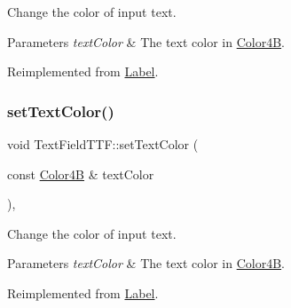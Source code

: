 Change the color of input text. 
\begin{DoxyParams}{Parameters}
{\em text\+Color} & The text color in \hyperlink{structColor4B}{Color4B}. \\
\hline
\end{DoxyParams}


Reimplemented from \hyperlink{classLabel_a692d2efd4b152b36df5cfcfbd9ee856d}{Label}.

\mbox{\label{classTextFieldTTF_a922f50aac8989d42977d1db5fe63da95}} 
\subsubsection{\texorpdfstring{set\+Text\+Color()}{setTextColor()}\hspace{0.1cm}{\footnotesize\ttfamily [2/2]}}
{\footnotesize\ttfamily void Text\+Field\+T\+T\+F\+::set\+Text\+Color (\begin{DoxyParamCaption}\item[{const \hyperlink{structColor4B}{Color4B} \&}]{text\+Color }\end{DoxyParamCaption})\hspace{0.3cm}{\ttfamily [override]}, {\ttfamily [virtual]}}

Change the color of input text. 
\begin{DoxyParams}{Parameters}
{\em text\+Color} & The text color in \hyperlink{structColor4B}{Color4B}. \\
\hline
\end{DoxyParams}


Reimplemented from \hyperlink{classLabel_a692d2efd4b152b36df5cfcfbd9ee856d}{Label}.

\mbox{\label{classTextFieldTTF_ae1e5accacb9d9708529a5daa653ae17e}} 
